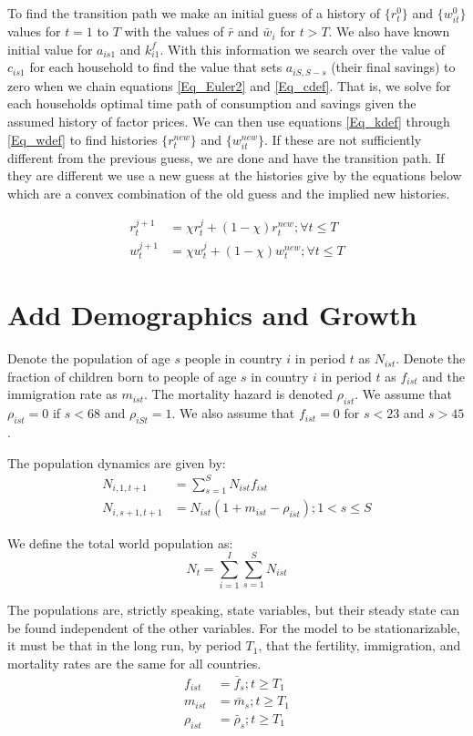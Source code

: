 \documentclass[letterpaper,12pt]{article}
\theoremstyle{definition}
\numberwithin{equation}{section}
\begin{document}
\begin{spacing}{1.5}
	To find the transition path we make an initial guess of a history of $\{r^0_t\}$ and $\{w^0_{it}\}$ values for $t=1$ to $T$ with the values of $\bar r$ and $\bar w_i$ for $t>T$.  We also have  known initial value for $a_{is1}$ and $k^f_{i1}$. With this information we search over the value of $c_{is1}$ for each household to find the value that sets $a_{iS,S-s}$ (their final savings) to zero when we chain equations \eqref{Eq_Euler2} and \eqref{Eq_cdef}.  That is, we solve for each households optimal time path of consumption and savings given the assumed history of factor prices.  We can then use equations \eqref{Eq_kdef} through \eqref{Eq_wdef} to find histories $\{r^{new}_t\}$ and $\{w^{new}_{it}\}$.  If these are not sufficiently different from the previous guess, we are done and have the transition path.  If they are different we use a new guess at the histories give by the equations below which are a convex combination of the old guess and the implied new histories.

	\begin{align}
		r^{j+1}_t & = \chi r^{j}_t + (1-\chi) r^{new}_t; \forall t \le T\\
		w^{j+1}_t & = \chi w^{j}_t + (1-\chi) w^{new}_t; \forall t \le T 
	\end{align}


\newpage
\section{Add Demographics and Growth}
	Denote the population of age $s$ people in country $i$ in period $t$ as $N_{ist}$.  Denote the fraction of children born to people of age $s$ in country $i$ in period $t$ as $f_{ist}$ and the immigration rate as $m_{ist}$.  The mortality hazard is denoted $\rho_{ist}$.  We assume that $\rho_{ist}=0$ if $s<68$ and $\rho_{iSt}=1$.  We also assume that $f_{ist} = 0$ for $s<23$ and $s>45$.

	The population dynamics are given by:
	\begin{align}
		N_{i,1,t+1} & = \sum_{s=1}^S N_{ist} f_{ist} \\
		N_{i,s+1,t+1} & = N_{ist} (1+m_{ist}-\rho_{ist}); 1<s\le S
	\end{align}

	We define the total world population as:
	\begin{equation}
		N_t = \sum_{i=1}^I \sum_{s=1}^S N_{ist}
	\end{equation}

	The populations are, strictly speaking, state variables, but their steady state can be found independent of the other variables.  For the model to be stationarizable, it must be that in the long run, by period $T_1$, that the fertility, immigration, and mortality rates are the same for all countries.
	\begin{align}
		f_{ist} & = \bar f_s; t \ge T_1 \\
		m_{ist} & = \bar m_s; t \ge T_1 \\
		\rho_{ist} & = \bar \rho_s; t \ge T_1
	\end{align}


\end{spacing}
\end{document}
